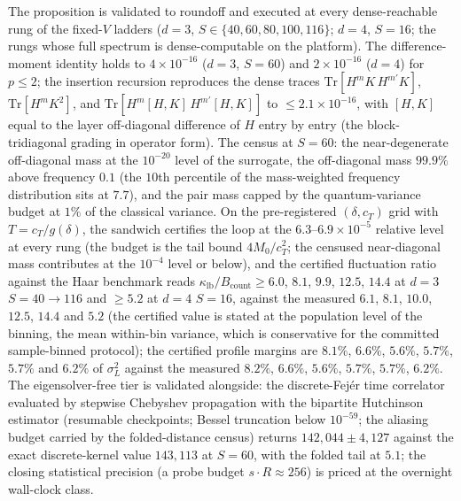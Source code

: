 \documentclass[11pt,a4paper]{article}
\theoremstyle{plain}
\theoremstyle{definition}
\theoremstyle{remark}
\begin{document}
The proposition is validated to roundoff and executed at every
dense-reachable rung of the fixed-$V$ ladders ($d=3$, $S\in\{40,60,80,
100,116\}$; $d=4$, $S=16$; the rungs whose full spectrum is dense-computable
on the platform).  The difference-moment identity holds to
$4\times10^{-16}$ ($d=3$, $S=60$) and $2\times10^{-16}$ ($d=4$) for
$p\le2$; the insertion recursion reproduces the dense traces
$\mathrm{Tr}[H^{m}K\,H^{m'}K]$, $\mathrm{Tr}[H^{m}K^{2}]$, and
$\mathrm{Tr}[H^{m}[H,K]\,H^{m'}[H,K]]$ to $\le2.1\times10^{-16}$, with
$[H,K]$ equal to the layer off-diagonal difference of $H$ entry by entry
(the block-tridiagonal grading in operator form).  The census at
$S=60$: the near-degenerate off-diagonal mass at the $10^{-20}$ level of
the surrogate, the off-diagonal mass $99.9\%$ above frequency $0.1$
(the $10$th percentile of the mass-weighted frequency distribution sits
at $7.7$), and the pair mass capped by the quantum-variance budget at
$1\%$ of the classical variance.  On the pre-registered
$(\delta,c_T)$ grid with $T=c_T/g(\delta)$, the sandwich certifies the
loop at the $6.3$--$6.9\times10^{-5}$ relative level at every rung
(the budget is the tail bound $4M_0/c_T^{2}$; the censused near-diagonal
mass contributes at the $10^{-4}$ level or below), and the certified
fluctuation ratio against the Haar benchmark reads
$\kappa_{\mathrm{lb}}/B_{\mathrm{count}}\ge6.0$, $8.1$, $9.9$, $12.5$,
$14.4$ at $d=3$ $S=40\to116$ and $\ge5.2$ at $d=4$ $S=16$, against the
measured $6.1$, $8.1$, $10.0$, $12.5$, $14.4$ and $5.2$ (the certified
value is stated at the population level of the binning, the mean
within-bin variance, which is conservative for the committed
sample-binned protocol); the certified profile margins are
$8.1\%$, $6.6\%$, $5.6\%$, $5.7\%$, $5.7\%$ and $6.2\%$ of
$\sigma_L^{2}$ against the measured $8.2\%$, $6.6\%$, $5.6\%$, $5.7\%$,
$5.7\%$, $6.2\%$.  The eigensolver-free tier is validated alongside: the
discrete-Fej\'er time correlator evaluated by stepwise Chebyshev
propagation with the bipartite Hutchinson estimator (resumable
checkpoints; Bessel truncation below $10^{-59}$; the aliasing budget
carried by the folded-distance census) returns $142{,}044\pm4{,}127$
against the exact discrete-kernel value $143{,}113$ at $S=60$, with the
folded tail at $5.1$; the closing statistical precision (a probe budget
$s\!\cdot\!R\approx256$) is priced at the overnight wall-clock class.
\end{document}
